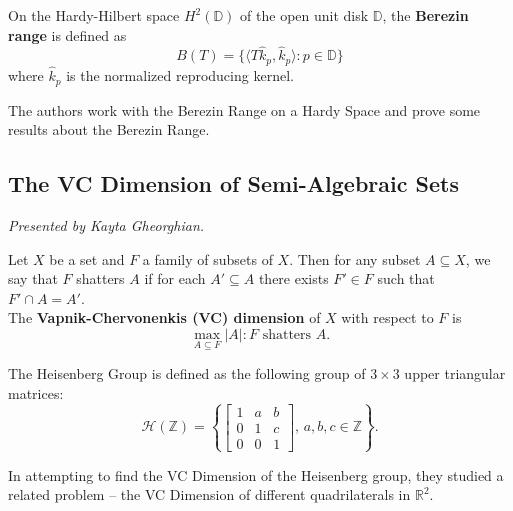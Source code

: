 \documentclass[12pt]{amsart}
\begin{document}
\begin{definition}
On the Hardy-Hilbert space $H^2(\mathbb{D})$ of the open unit disk $\mathbb{D}$, the \textbf{Berezin range} is defined as 
\[B(T) = \{ \langle T\hat{k}_p, \hat{k}_p \rangle : p \in \mathbb{D}\}\]
where $\hat{k}_p$ is the normalized reproducing kernel.

\end{definition}
\begin{result*}
The authors work with the Berezin Range on a Hardy Space and prove some results about the Berezin Range.
\end{result*}

\vspace{2.5cm}

\newpage

\subsection{The VC Dimension of Semi-Algebraic Sets}

\textit{}
\vspace{0.25cm}

\textit{Presented by Kayta Gheorghian.}

\begin{definition}[VC Dimension]
Let $X$ be a set and $F$ a family of subsets of $X$. Then for any subset
$A \subseteq X$, we say that $F$ shatters $A$ if for each $A' \subseteq A$ there exists $F' \in F$ such that $F' \cap A = A'.$ \\

The \textbf{Vapnik-Chervonenkis (VC) dimension} of $X$ with respect to $F$ is
\[ \max_{A \subseteq F} |A| : F \text{ shatters } A.\]
\end{definition}

\begin{definition}
The Heisenberg Group is defined as the following group of $3 \times 3$ upper triangular matrices: \[\mathcal{H}(\mathbb{Z}) = \left \{\begin{bmatrix} 1 & a & b \\ 0 & 1 & c \\ 0 & 0 & 1\end{bmatrix}, \, a, b, c \in \mathbb{Z} \right\}.\]
\end{definition}

\begin{result*}
In attempting to find the VC Dimension of the Heisenberg group, they studied a related problem -- the VC Dimension of different quadrilaterals in $\mathbb{R}^2$.
\end{result*}
\end{document}
